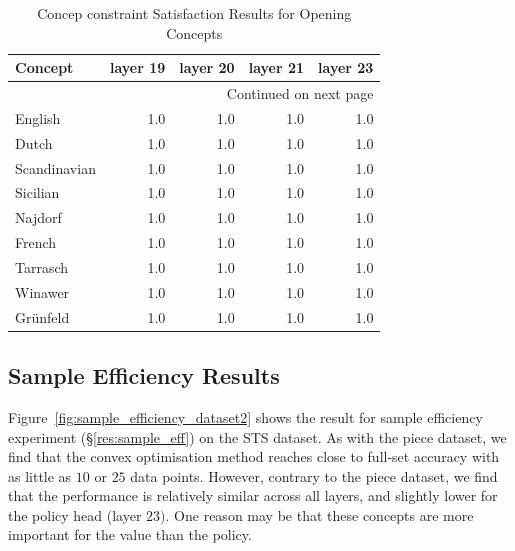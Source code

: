 \documentclass{article}
\begin{document}
\begin{longtable}{lrrrr}
\caption{Concep constraint Satisfaction Results for Opening Concepts}
\label{table:opening} \\ 
\toprule
      Concept &  layer 19 &  layer 20 &  layer 21 &  layer 23 \\
\midrule
\endhead
\midrule
\multicolumn{5}{r}{{Continued on next page}} \\
\midrule
\endfoot

\bottomrule
\endlastfoot
      English &      1.0 &      1.0 &      1.0 &      1.0 \\
        Dutch &      1.0 &      1.0 &      1.0 &      1.0 \\
 Scandinavian &      1.0 &      1.0 &      1.0 &      1.0 \\
     Sicilian &      1.0 &      1.0 &      1.0 &      1.0 \\
      Najdorf &      1.0 &      1.0 &      1.0 &      1.0 \\
       French &      1.0 &      1.0 &      1.0 &      1.0 \\
    Tarrasch &      1.0 &      1.0 &      1.0 &      1.0 \\
      Winawer &      1.0 &      1.0 &      1.0 &      1.0 \\
     Grünfeld &      1.0 &      1.0 &      1.0 &      1.0 \\
\end{longtable}

\subsection{Sample Efficiency Results} \label{appx:sample_efficiency}

Figure~\ref{fig:sample_efficiency_dataset2} shows the result for sample efficiency experiment (\S\ref{res:sample_eff}) on the STS dataset.
As with the piece dataset, we find that the convex optimisation method reaches close to full-set accuracy with as little as $10$ or $25$ data points.
However, contrary to the piece dataset, we find that the performance is relatively similar across all layers, and slightly lower for the policy head (layer $23)$. 
One reason may be that these concepts are more important for the value than the policy. 
\end{document}
